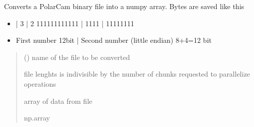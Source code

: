 \documentclass[letterpaper,10pt,english]{sphinxmanual}
\begin{document}

\begin{fulllineitems}
\label{\detokenize{micropolarray.processing:micropolarray.processing.convert.nparr_from_binary}}
\pysigstartsignatures
{}
\pysigstopsignatures
\sphinxAtStartPar
Converts a PolarCam binary file into a numpy array. Bytes are saved like this
\begin{itemize}
\item {} \begin{description}
             |   3                |     2
111111111111       | 1111               | 11111111

\end{description}

\item {} \begin{description}
\sphinxAtStartPar
First number 12bit | Second number (little endian) 8+4=12 bit

\end{description}

\end{itemize}
\begin{quote}\begin{description}
\sphinxAtStartPar
{} () \textendash{} name of the file to be converted

\sphinxAtStartPar
{} \textendash{} file lenghts is indivisible by the number of chunks requested to parallelize operations

\sphinxAtStartPar
array of data from file

\sphinxAtStartPar
np.array

\end{description}\end{quote}

\end{fulllineitems}

\end{document}
